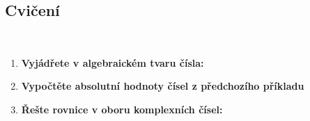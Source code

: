 \wikitextrule
\subsection{Cvičení}\label{mai:exam081}~ %
  \small
  \begin{enumerate}
    \item \textbf{Vyjádřete v algebraickém tvaru čísla:}%
      \begin{addmargin}[.1\linewidth]{.2\linewidth}%
      \end{addmargin}
   \item \textbf{Vypočtěte absolutní hodnoty čísel z předchozího příkladu}
   \item \textbf{Řešte rovnice v oboru komplexních čísel:}
  \end{enumerate}


  \normalsize